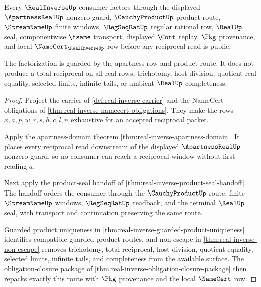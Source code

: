 \begin{theorem}
\label{thm:real-inverse-apartness-product-scope}
Every $\RealInverseUp$ consumer factors through the displayed $\ApartnessRealUp$ nonzero guard, $\CauchyProductUp$ product route, $\StreamNameUp$ finite windows, $\RegSeqRatUp$ regular rational row, $\RealUp$ seal, componentwise $\hsame$ transport, displayed $\Cont$ replay, $\Pkg$ provenance, and local $\NameCert_{\RealInverseUp}$ row before any reciprocal read is public.

The factorization is guarded by the apartness row and product route. It does not produce a total reciprocal on all real rows, trichotomy, host division, quotient real equality, selected limits, infinite tails, or ambient $\RealUp$ completeness.
\end{theorem}
\begin{proof}
Project the carrier of \autoref{def:real-inverse-carrier} and the NameCert obligations of \autoref{thm:real-inverse-namecert-obligations}. They make the rows $x,a,p,w,r,s,h,c,l,n$ exhaustive for an accepted reciprocal packet.

Apply the apartness-domain theorem \autoref{thm:real-inverse-apartness-domain}. It places every reciprocal read downstream of the displayed $\ApartnessRealUp$ nonzero guard, so no consumer can reach a reciprocal window without first reading $a$.

Next apply the product-seal handoff of \autoref{thm:real-inverse-product-seal-handoff}. The handoff orders the consumer through the $\CauchyProductUp$ route, finite $\StreamNameUp$ windows, $\RegSeqRatUp$ readback, and the terminal $\RealUp$ seal, with transport and continuation preserving the same route.

Guarded product uniqueness in \autoref{thm:real-inverse-guarded-product-uniqueness} identifies compatible guarded product routes, and non-escape in \autoref{thm:real-inverse-non-escape} removes trichotomy, total reciprocal, host division, quotient equality, selected limits, infinite tails, and completeness from the available surface. The obligation-closure package of \autoref{thm:real-inverse-obligation-closure-package} then repacks exactly this route with $\Pkg$ provenance and the local $\NameCert$ row.
\end{proof}

